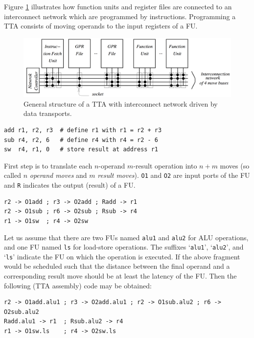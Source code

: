 Figure \ref{fig:tta} illustrates how function units and register files are connected to an interconnect network which are programmed by instructions. Programming a TTA consists of moving operands to the input registers of a FU.

\begin{figure}[b!]
\centering
\includegraphics[width=.8\textwidth]{figures/tta_structure}
\caption{General structure of a TTA with interconnect network driven by data transports.}
\label{fig:tta}
\end{figure}

\begin{lstlisting}
add r1, r2, r3  # define r1 with r1 = r2 + r3
sub r4, r2, 6   # define r4 with r4 = r2 - 6
sw  r4, r1, 0   # store result at address r1
\end{lstlisting}

First step is to translate each $n$-operand $m$-result operation into $n+m$ moves (so called $n$ \emph{operand moves} and $m$ \emph{result moves}). \texttt{O1} and \texttt{O2} are input ports of the FU and \texttt{R} indicates the output (result) of a FU.

\begin{lstlisting}
r2 -> O1add ; r3 -> O2add ; Radd -> r1
r2 -> O1sub ; r6 -> O2sub ; Rsub -> r4
r1 -> O1sw  ; r4 -> O2sw
\end{lstlisting}

Let us assume that there are two FUs named \texttt{alu1} and \texttt{alu2} for ALU operations, and one FU named \texttt{ls} for load-store operations. The suffixes `\texttt{alu1}', `\texttt{alu2}', and `\texttt{ls}' indicate the FU on which the operation is executed.
If the above fragment would be scheduled such that the distance between the final operand and a corresponding result move should be at least the latency of the FU. Then the following (TTA assembly) code may be obtained:

\begin{lstlisting}
r2 -> O1add.alu1 ; r3 -> O2add.alu1 ; r2 -> O1sub.alu2 ; r6 -> O2sub.alu2
Radd.alu1 -> r1  ; Rsub.alu2 -> r4
r1 -> O1sw.ls    ; r4 -> O2sw.ls
\end{lstlisting}


